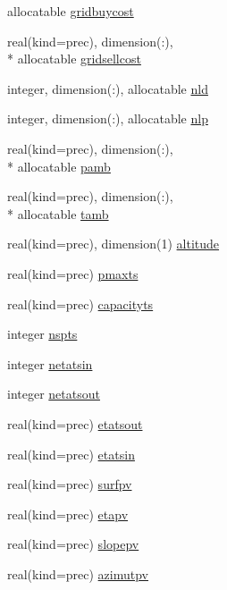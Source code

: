 \begin{DoxyCompactItemize}
allocatable \hyperlink{classinputvar_a10f5c69ad85799dd2ae3a39500ba3005}{gridbuycost}
\item 
real(kind=prec), dimension(\-:), \\*
allocatable \hyperlink{classinputvar_a2f72c3ce64312b528c0679cbd950fb8f}{gridsellcost}
\item 
integer, dimension(\-:), allocatable \hyperlink{classinputvar_a8c5a23a5a519fb86c67fc1465aef0e33}{nld}
\item 
integer, dimension(\-:), allocatable \hyperlink{classinputvar_a3f2f71983b35bd63596385392671f89d}{nlp}
\item 
real(kind=prec), dimension(\-:), \\*
allocatable \hyperlink{classinputvar_a241f8b7a07fdc252022c2ef56cfded42}{pamb}
\item 
real(kind=prec), dimension(\-:), \\*
allocatable \hyperlink{classinputvar_a1cdc501a6b8cb511ab141219362b9aaa}{tamb}
\item 
real(kind=prec), dimension(1) \hyperlink{classinputvar_a3f078edd3f3cfd59802ac6321ad3b837}{altitude}
\item 
real(kind=prec) \hyperlink{classinputvar_a6301e249eea800b1c3052280fce007b2}{pmaxts}
\item 
real(kind=prec) \hyperlink{classinputvar_aa1efd68463d126d8971abdafa06d3a33}{capacityts}
\item 
integer \hyperlink{classinputvar_aaefd22e32dc26863fb189c2a0305ac3b}{nspts}
\item 
integer \hyperlink{classinputvar_accdc85c467baf46e33e1237e719ad174}{netatsin}
\item 
integer \hyperlink{classinputvar_ac0b8841a56f7e91ebd3c2878d4499c2b}{netatsout}
\item 
real(kind=prec) \hyperlink{classinputvar_a1855fdf34565c8a9555f350ae7958ecd}{etatsout}
\item 
real(kind=prec) \hyperlink{classinputvar_ad3f2c5423c51b51ac0cc6460154eab83}{etatsin}
\item 
real(kind=prec) \hyperlink{classinputvar_a96c41574bce3d9f6f6493a87e1a5147e}{surfpv}
\item 
real(kind=prec) \hyperlink{classinputvar_abd526b84db5033c573303c7859b28963}{etapv}
\item 
real(kind=prec) \hyperlink{classinputvar_a14912f73e74d3dedf580804ab63fd57f}{slopepv}
\item 
real(kind=prec) \hyperlink{classinputvar_ae36a6ce527f47c090cf19f733d28b6d7}{azimutpv}
\item 

\end{DoxyCompactItemize}
